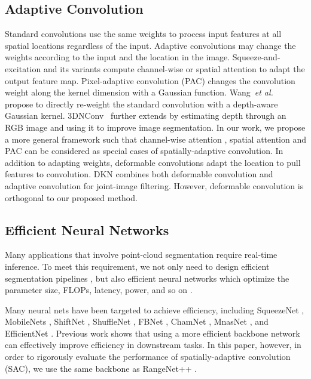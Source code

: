 \documentclass[runningheads]{llncs}
\begin{document}
\subsection{Adaptive Convolution}
Standard convolutions use the same weights to process input features at all spatial locations regardless of the input. Adaptive convolutions may change the weights according to the input and the location in the image. Squeeze-and-excitation and its variants \cite{hu2018squeeze,hu2018gather,woo2018cbam} compute channel-wise or spatial attention to adapt the output feature map. Pixel-adaptive convolution (PAC) \cite{su2019pixel} changes the convolution weight along the kernel dimension with a Gaussian function. Wang~\textit{et al.}~\cite{wang2018depth} propose to directly re-weight the standard convolution with a depth-aware Gaussian kernel. 3DNConv~\cite{chen20193d} further extends \cite{wang2018depth} by estimating depth through an RGB image and using it to improve image segmentation. In our work, we propose a more general framework such that channel-wise attention \cite{hu2018squeeze,hu2018gather}, spatial attention \cite{woo2018cbam,wu2018squeezesegv2} and PAC \cite{su2019pixel} can be considered as special cases of spatially-adaptive convolution. 
In addition to adapting weights, deformable convolutions \cite{dai2017deformable,zhu2019deformable} adapt the location to pull features to convolution. DKN \cite{kim2019deformable} combines both deformable convolution and adaptive convolution for joint-image filtering. However, deformable convolution is orthogonal to our proposed method.

\subsection{Efficient Neural Networks}
Many applications that involve point-cloud segmentation require real-time inference. To meet this requirement, we not only need to design efficient segmentation pipelines \cite{wu2018squeezesegv2}, but also efficient neural networks which optimize the parameter size, FLOPs, latency, power, and so on \cite{wu2019efficient}. 


Many  neural nets have been targeted to achieve efficiency, including SqueezeNet \cite{iandola2016squeezenet,gholami2018squeezenext,wu2017squeezedet}, MobileNets \cite{howard2017mobilenets,sandler2018mobilenetv2,howard2019searching},  ShiftNet \cite{wu2018shift,yang2019synetgy}, ShuffleNet \cite{zhang2018shufflenet,ma2018shufflenet}, FBNet \cite{wu2019fbnet,wu2018mixed}, ChamNet \cite{dai2019chamnet}, MnasNet \cite{tan2019mnasnet}, and EfficientNet \cite{tan2019efficientnet}. Previous work shows that using a more efficient backbone network can effectively improve efficiency in downstream tasks. In this paper, however, in order to rigorously evaluate the performance of spatially-adaptive convolution (SAC), we use the same backbone as RangeNet++ \cite{milioto2019rangenet++}. 
\end{document}
